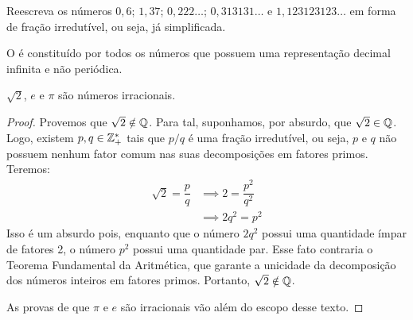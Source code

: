 \begin{exercise}
Reescreva os números $0{,}6$; $1{,}37$; $0{,}222\dots$; $0{,}313131 \dots$ e $1{,}123123123 \dots$ em forma de fração irredutível, ou seja, já simplificada.
\end{exercise}

\begin{definition}
O  é constituído por todos os números que possuem uma representação decimal infinita e não periódica.
\end{definition}

\begin{example}
$\sqrt 2$, $e$ e $\pi$ são números irracionais.
\end{example}

\begin{proof}
Provemos que $\sqrt2 \notin \mathbb{Q}$. Para tal, suponhamos, por absurdo, que $\sqrt2 \in \mathbb{Q}$. Logo, existem $p, q \in \mathbb{Z}^*_+$ tais que $p/q$ é uma fração irredutível, ou seja, $p$ e $q$ não possuem nenhum fator comum nas suas decomposições em fatores primos. Teremos:
%
\begin{equation*}
\begin{aligned}
\sqrt2 = \dfrac{p}{q} & \implies 2 = \dfrac{p^2}{q^2} \\
& \implies 2q^2 = p^2
\end{aligned}
\end{equation*}
%
Isso é um absurdo pois, enquanto que o número $2q^2$ possui uma quantidade ímpar de fatores 2, o número $p^2$ possui uma quantidade par. Esse fato contraria o Teorema Fundamental da Aritmética, que garante a unicidade da decomposição dos números inteiros em fatores primos. Portanto, $\sqrt2 \notin \mathbb{Q}$.

As provas de que $\pi$ e $e$ são irracionais vão além do escopo desse texto. 
\end{proof}

